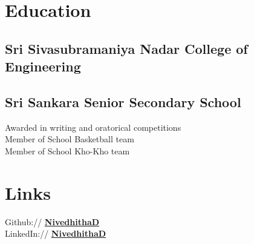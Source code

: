 \documentclass[]{deedy-resume-openfont}
\begin{document}
%
%

%
%

%
%

\begin{minipage}[t]{0.33\textwidth} 


\section{Education} 

\subsection{Sri Sivasubramaniya Nadar College of Engineering}
\sectionsep

\subsection{Sri Sankara Senior Secondary School}
Awarded in writing and oratorical competitions \\
Member of School Basketball team \\
Member of School Kho-Kho team \\
\sectionsep


\section{Links}
Github:// \href{https://github.com/nive927}{\bf NivedhithaD} \\
LinkedIn://  \href{https://www.linkedin.com/in/nivedhitha-d-0bb67b1b0}{\bf NivedhithaD} \\


\end{minipage}
\end{document}
